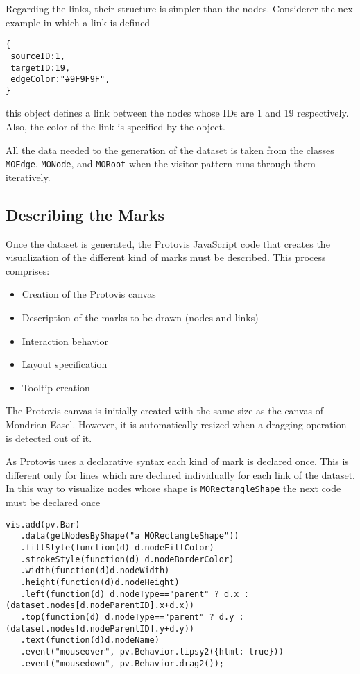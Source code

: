 \documentclass[preprint,10pt]{sigplanconf}
\newcommand{\ct}{\lstinline[backgroundcolor=\color{white},basicstyle=\footnotesize\ttfamily]}
\newcommand{\sv}[1]{\nb{Santiago}{orange}{#1}}
\begin{document}
Regarding the links, their structure is simpler than the nodes. Considerer the nex example in which a link is defined
\begin{lstlisting} 
{
 sourceID:1, 
 targetID:19,
 edgeColor:"#9F9F9F",
}
\end{lstlisting}
this object defines a link between the nodes whose IDs are 1 and 19 respectively. Also, the color of the link is specified by the object. 

All the data needed to the generation of the dataset is taken from the classes \ct{MOEdge}, \ct{MONode}, and \ct{MORoot} when the visitor pattern runs through them iteratively.


\subsection{Describing the Marks}

Once the dataset is generated, the Protovis JavaScript code that creates the visualization of the different kind of marks must be described. This process comprises: 
\begin{itemize}
\item Creation of the Protovis canvas
\item Description of the marks to be drawn (nodes and links)
\item Interaction behavior
\item Layout specification
\item Tooltip creation
\end{itemize}

The Protovis canvas is initially created with the same size as the canvas of Mondrian Easel. However, it is automatically resized when a dragging operation is detected out of it.

As Protovis uses a declarative syntax each kind of mark is declared once. This is different only for lines which are declared individually for each link of the dataset. In this way to visualize nodes whose shape is \ct{MORectangleShape} the next code must be declared once
\begin{lstlisting} 
vis.add(pv.Bar)
   .data(getNodesByShape("a MORectangleShape"))
   .fillStyle(function(d) d.nodeFillColor)
   .strokeStyle(function(d) d.nodeBorderColor)
   .width(function(d)d.nodeWidth)
   .height(function(d)d.nodeHeight)
   .left(function(d) d.nodeType=="parent" ? d.x : (dataset.nodes[d.nodeParentID].x+d.x))
   .top(function(d) d.nodeType=="parent" ? d.y : (dataset.nodes[d.nodeParentID].y+d.y))
   .text(function(d)d.nodeName)
   .event("mouseover", pv.Behavior.tipsy2({html: true}))
   .event("mousedown", pv.Behavior.drag2());
\end{lstlisting}
\end{document}
